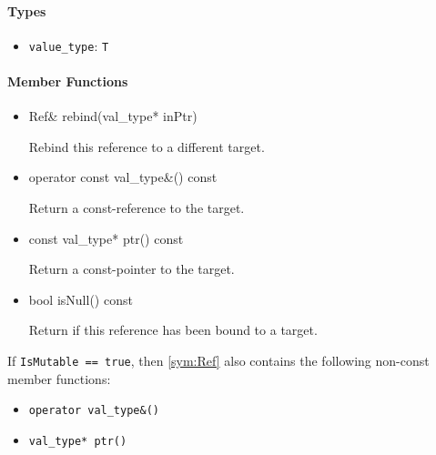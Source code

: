 \paragraph{Types}

\begin{itemize}
	\item
		\texttt{value\_type}: \texttt{T}
\end{itemize}

\paragraph{Member Functions}

\begin{itemize}
	\item
		\begin{cppsnippet}
		Ref& rebind(val_type* inPtr)
		\end{cppsnippet}

		Rebind this reference to a different target.

	\item
		\begin{cppsnippet}
		operator const val_type&() const
		\end{cppsnippet}

		Return a const-reference to the target.

	\item
		\begin{cppsnippet}
		const val_type* ptr() const
		\end{cppsnippet}

		Return a const-pointer to the target.
	
	\item
		\begin{cppsnippet}
		bool isNull() const
		\end{cppsnippet}

		Return if this reference has been bound to a target.
\end{itemize}

If \texttt{IsMutable == true}, then \ref{sym:Ref} also contains the following non-const member functions:

\begin{itemize}
	\item \texttt{operator val\_type\&()}
	\item \texttt{val\_type* ptr()}
\end{itemize}


